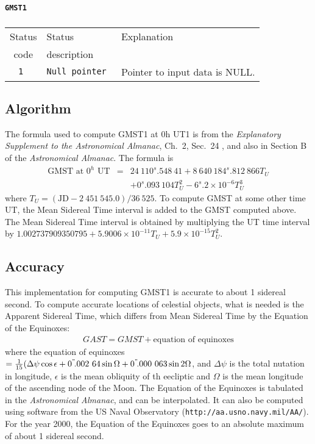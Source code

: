 \paragraph{\texttt{GMST1}}

\subparagraph{}

\begin{tabular}{|c|l|l|}
  \hline
  Status & Status       & Explanation \\
  code   & description  &             \\
  \hline
  \tt 1  & \tt Null pointer & Pointer to input data is NULL. \\
  \hline
\end{tabular}

\subsection{Algorithm}

The formula used to compute GMST1 at 0h UT1 is from the \textit{Explanatory
Supplement to the Astronomical Almanac}, Ch.~2, Sec.~24 \cite{esaa:1992},
and also in Section B of the \textit{Astronomical Almanac}.  The formula is
%
\begin{eqnarray*}
    {\text{GMST at $0^{h}$ UT}} & = & 24\ 110^{s}\!.548\ 41 + 8\ 640\ 184^{s}\!.812\ 866 T_{U} \\
 & & + 0^{s}\!.093\ 104 T_{U}^{2} - 6^{s}\!.2\times10^{-6} T_{U}^{3}
\end{eqnarray*}
%
where $T_{U} = (\mathrm{JD} - 2\ 451\ 545.0)/36\ 525$.  To compute GMST at
some other time UT, the Mean Sidereal Time interval is added to the GMST
computed above.  The Mean Sidereal Time interval is obtained by multiplying
the UT time interval by $1.002737909350795 + 5.9006\times10^{-11}T_{U} +
5.9\times10^{-15}T_{U}^{2}$.


\subsection{Accuracy}
This implementation for computing GMST1 is accurate to about 1 sidereal
second.  To compute accurate locations of celestial objects, what is needed
is the Apparent Sidereal Time, which differs from Mean Sidereal Time by the
Equation of the Equinoxes:
%
\begin{eqnarray*}
  GAST = GMST + \textrm{equation of equinoxes}
\end{eqnarray*}
%
where the equation of equinoxes $= \frac{1}{15}(\Delta\psi \cos\epsilon +
0^{"}\!.002\ 64 \sin\Omega + 0^{"}\!.000\ 063 \sin
2\Omega$, and $\Delta\psi$ is the total nutation in longitude, $\epsilon$
is the mean obliquity of th eecliptic and $\Omega$ is the mean longitude of
the ascending node of the Moon.  The Equation of the Equinoxes is tabulated
in the \textit{Astronomical Almanac}, and can be interpolated.  It can also
be computed using software from the US Naval Observatory
(\texttt{http://aa.usno.navy.mil/AA/}). For the year 2000, the Equation of
the Equinoxes goes to an absolute maximum of about 1 sidereal second.

